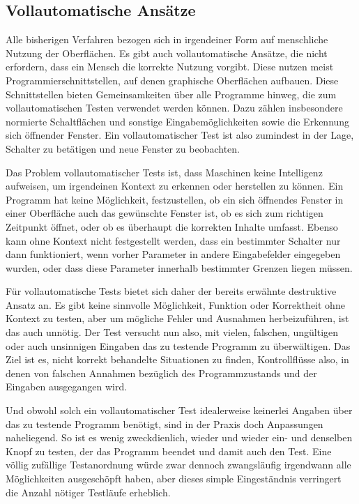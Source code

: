 \subsection{Vollautomatische Ansätze}

Alle bisherigen Verfahren bezogen sich in irgendeiner Form auf menschliche Nutzung der
Oberflächen. Es gibt auch vollautomatische Ansätze, die nicht erfordern, dass ein Mensch
die korrekte Nutzung vorgibt. Diese nutzen meist Programmierschnittstellen,
auf denen graphische Oberflächen aufbauen. Diese Schnittstellen bieten Gemeinsamkeiten
über alle Programme hinweg, die zum vollautomatischen Testen verwendet werden können.
Dazu zählen insbesondere normierte Schaltflächen und sonstige Eingabemöglichkeiten
sowie die Erkennung sich öffnender Fenster. Ein vollautomatischer Test ist also zumindest
in der Lage, Schalter zu betätigen und neue Fenster zu beobachten.

Das Problem vollautomatischer Tests ist, dass Maschinen keine Intelligenz aufweisen,
um irgendeinen Kontext zu erkennen oder herstellen zu können. Ein Programm hat
keine Möglichkeit, festzustellen, ob ein sich öffnendes Fenster in einer Oberfläche
auch das gewünschte Fenster ist, ob es sich zum richtigen Zeitpunkt öffnet, oder
ob es überhaupt die korrekten Inhalte umfasst. Ebenso kann ohne Kontext nicht festgestellt
werden, dass ein bestimmter Schalter nur dann funktioniert, wenn vorher Parameter
in andere Eingabefelder eingegeben wurden, oder dass diese Parameter innerhalb bestimmter
Grenzen liegen müssen.

Für vollautomatische Tests bietet sich daher der bereits erwähnte destruktive Ansatz an.
Es gibt keine sinnvolle Möglichkeit, Funktion oder Korrektheit ohne Kontext zu testen,
aber um mögliche Fehler und Ausnahmen herbeizuführen, ist das auch unnötig.
Der Test versucht nun also, mit vielen, falschen, ungültigen oder auch unsinnigen
Eingaben das zu testende Programm zu überwältigen. Das Ziel ist es, nicht korrekt
behandelte Situationen zu finden, Kontrollflüsse also, in denen von falschen
Annahmen bezüglich des Programmzustands und der Eingaben ausgegangen wird.

Und obwohl solch ein vollautomatischer Test idealerweise keinerlei Angaben
über das zu testende Programm benötigt, sind in der Praxis doch Anpassungen
naheliegend. So ist es wenig zweckdienlich, wieder und wieder ein- und 
denselben Knopf zu testen,
der das Programm beendet und damit auch den Test. Eine völlig zufällige
Testanordnung würde zwar dennoch zwangsläufig irgendwann alle Möglichkeiten
ausgeschöpft haben, aber dieses simple Eingeständnis verringert die
Anzahl nötiger Testläufe erheblich.

